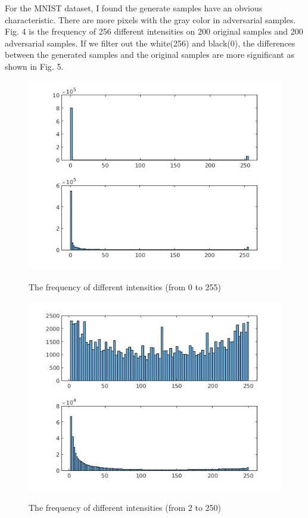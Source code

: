 \documentclass[a4paper]{article}
\begin{document}
For the MNIST dataset, I found the generate samples have an obvious characteristic. There are more pixels with the gray color in adversarial samples. Fig. 4  is the frequency of 256 different intensities on 200 original samples and 200 adversarial samples. If we filter out the white(256) and black(0), the differences between the generated samples and the original samples are more significant as shown in Fig. 5.

\begin{figure}
\centering
\begin{minipage}[t]{0.45\textwidth}
\centering
\includegraphics[scale=0.3]{freq2.jpg}
\label{freq2}
\caption{The frequency of different intensities (from 0 to 255)}

\end{minipage}
\begin{minipage}[t]{0.45\textwidth}
\centering
\includegraphics[scale=0.3]{freq.jpg}
\label{freq}
\caption{The frequency of different intensities (from 2 to 250)}
\end{minipage}
\end{figure}
\end{document}
